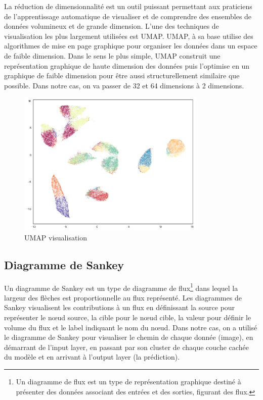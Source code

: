 \documentclass[oneside,13pt,a4paper]{report}
\begin{document}
La réduction de dimensionnalité est un outil puissant permettant aux praticiens de l'apprentissage automatique de visualiser et de comprendre des ensembles de données volumineux et de grande dimension\cite{clustering}. L'une des techniques de visualisation les plus largement utilisées est UMAP.
UMAP, à sa base utilise des algorithmes de mise en page graphique pour organiser les données dans un espace de faible dimension. Dans le sens le plus simple, UMAP construit une représentation graphique de haute dimension des données puis l'optimise en un graphique de faible dimension pour être aussi structurellement similaire que possible. Dans notre cas, on va passer de 32 et 64 dimensions à 2 dimensions.\cite{umap}

\begin{figure}[!h]
\center
\includegraphics[width=0.8\textwidth]{img/UMAP.png}
\caption{UMAP visualisation}
\end{figure}

\subsection{Diagramme de Sankey}

Un diagramme de Sankey est un type de diagramme de flux\footnote{Un diagramme de flux est un type de représentation graphique destiné à présenter des données associant des entrées et des sorties, figurant des flux.} dans lequel la largeur des flèches est proportionnelle au flux représenté.
Les diagrammes de Sankey visualisent les contributions à un flux en définissant la source pour représenter le nœud source, la cible pour le nœud cible, la valeur pour définir le volume du flux et le label indiquant le nom du nœud. Dans notre cas, on a utilisé le diagramme de Sankey pour visualiser le chemin de chaque donnée (image), en démarrant de l'input layer, en passant par son cluster de chaque couche cachée du modèle et en arrivant à l'output layer (la prédiction).
\end{document}

